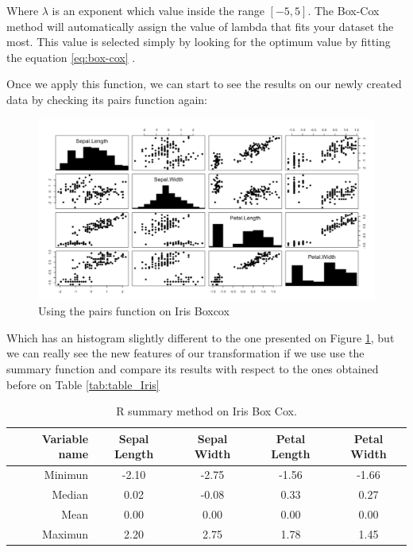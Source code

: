 Where $\lambda$ is an exponent which value inside the range $[-5,5]$. The Box-Cox method will automatically assign the value of lambda that fits your dataset the most. This value is selected simply by looking for the optimum value by fitting the equation \ref{eq:box-cox} . \par

Once we apply this function, we can start to see the results on our newly created data by checking its pairs function again:

\begin{figure}[H]
	\centering
	\includegraphics[width=17cm]{Figuras_tfg/Figure_Boxcox}
	\caption{Using the pairs function on Iris Boxcox}
	\label{fig:figure_pairs_iris}
\end{figure}

Which has an histogram slightly different to the one presented on Figure \ref{fig:figure_pairs_iris}, but we can really see the new features of our transformation if we use use the summary function and compare its results with respect to the ones obtained before on Table \ref{tab:table_Iris}
\newline

\begin{table}[H]
		\caption{R summary method on Iris Box Cox.}
	\begin{center}
	\label{tab:table_Iris_Boxcox}
		\begin{tabular}{r|c|c|c|c} %
			\textbf{Variable name} & \textbf{Sepal Length} & \textbf{Sepal Width} & \textbf{Petal Length} & \textbf{Petal Width}\\
			\hline
			Minimun & -2.10 & -2.75 & -1.56 & -1.66\\
			Median & 0.02 & -0.08 & 0.33 & 0.27\\
			Mean & 0.00 & 0.00 & 0.00 & 0.00\\
			Maximun & 2.20 & 2.75 & 1.78 & 1.45\\
		\end{tabular}
	\end{center}
\end{table}

